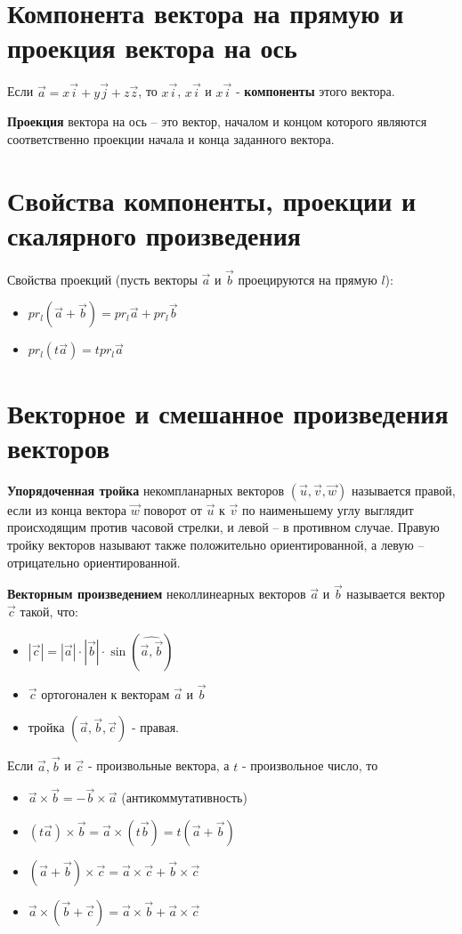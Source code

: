 \documentclass[a4paper]{article}
\begin{document}
{\begin{small}
\section*{Компонента вектора на прямую и проекция вектора на ось
}
Если $\vec{a} = x \vec{i} + y \vec{j} + z \vec{z}$, то $x \vec{i}$, $x \vec{i}$ и $x \vec{i}$ - \textbf{компоненты} этого вектора.

\textbf{Проекция} вектора на ось – это вектор, началом и концом которого являются соответственно проекции начала и конца заданного вектора.

\section*{Свойства компоненты, проекции и скалярного произведения}

Свойства проекций (пусть векторы $\vec{a}$ и $\vec{b}$ проецируются на прямую $l$):
\begin{itemize}
\item $pr_l (\vec{a} + \vec{b}) = pr_l \vec{a} + pr_l \vec{b}$
\item $pr_l (t \vec{a}) = t pr_l \vec{a}$
\end{itemize}

\section*{Векторное и смешанное произведения векторов}

\textbf{Упорядоченная тройка} некомпланарных векторов $(\vec{u}, \vec{v}, \vec{w})$  называется
правой, если из конца вектора $\vec{w}$ поворот от $\vec{u}$ к $\vec{v}$ по наименьшему углу
выглядит происходящим против часовой стрелки, и левой – в противном случае. Правую тройку векторов называют также положительно
ориентированной, а левую – отрицательно ориентированной.

\textbf{Векторным произведением} неколлинеарных векторов $\vec{a}$ и $\vec{b}$ называется
вектор $\vec{c}$ такой, что:
\begin{itemize}
\item $| \vec{c}| = | \vec{a} | \cdot | \vec{b} | \cdot \sin (\widehat{\vec{a}, \vec{b}})$
\item $\vec{c}$ ортогонален к векторам $\vec{a}$ и $\vec{b}$
\item тройка $(\vec{a}, \vec{b}, \vec{c})$ - правая.
\end{itemize}

Если $\vec{a}, \vec{b}$ и $\vec{c}$ - произвольные вектора, а $t$ - произвольное число, то
\begin{itemize}
\item $\vec{a} \times \vec{b} = -\vec{b} \times \vec{a}$ (антикоммутативность)
\item $(t \vec{a}) \times \vec{b} = \vec{a} \times (t \vec{b}) = t ( \vec{a} + \vec{b})$
\item $(\vec{a} +\vec{b}) \times \vec{c} = \vec{a} \times \vec{c} + \vec{b} \times \vec{c}$
\item $\vec{a} \times (\vec{b} + \vec{c}) = \vec{a} \times \vec{b} +\vec{a} \times \vec{c}$
\end{itemize}


\end{small}}
\end{document}
